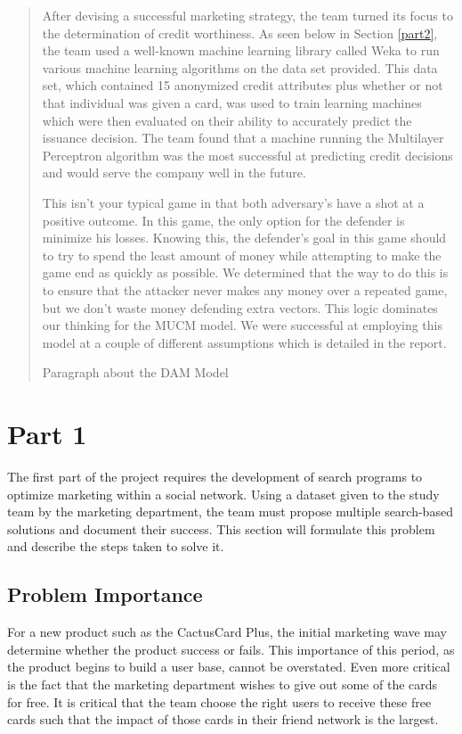 \documentclass[11pt,journal]{IEEEtran}
\begin{document}
\begin{abstract}
\par
After devising a successful marketing strategy, the team turned its focus to the determination of credit worthiness. As seen below in Section \ref{part2}, the team used a well-known machine learning library called Weka to run various machine learning algorithms on the data set provided. This data set, which contained 15 anonymized credit attributes plus whether or not that individual was given a card, was used to train learning machines which were then evaluated on their ability to accurately predict the issuance decision. The team found that a machine running the Multilayer Perceptron algorithm was the most successful at predicting credit decisions and would serve the company well in the future.
\par
This isn’t your typical game in that both adversary’s have a shot at a positive outcome. In this game, the only option for the defender is minimize his losses. Knowing this, the defender’s goal in this game should to try to spend the least amount of money while attempting to make the game end as quickly as possible. We determined that the way to do this is to ensure that the attacker never makes any money over a repeated game, but we don’t waste money defending extra vectors. This logic dominates our thinking for the MUCM model. We were successful at employing this model at a couple of different assumptions which is detailed in the report.
\par
Paragraph about the DAM Model\end{abstract}
\newpage

\IEEEpeerreviewmaketitle

\section{Part 1} \label{part1}
The first part of the project requires the development of search programs to optimize marketing within a social network. Using a dataset given to the study team by the marketing department, the team must propose multiple search-based solutions and document their success. This section will formulate this problem and describe the steps taken to solve it.

\subsection{Problem Importance}
For a new product such as the CactusCard Plus, the initial marketing wave may determine whether the product success or fails. This importance of this period, as the product begins to build a user base, cannot be overstated. Even more critical is the fact that the marketing department wishes to give out some of the cards for free. It is critical that the team choose the right users to receive these free cards such that the impact of those cards in their friend network is the largest.
\end{document}
